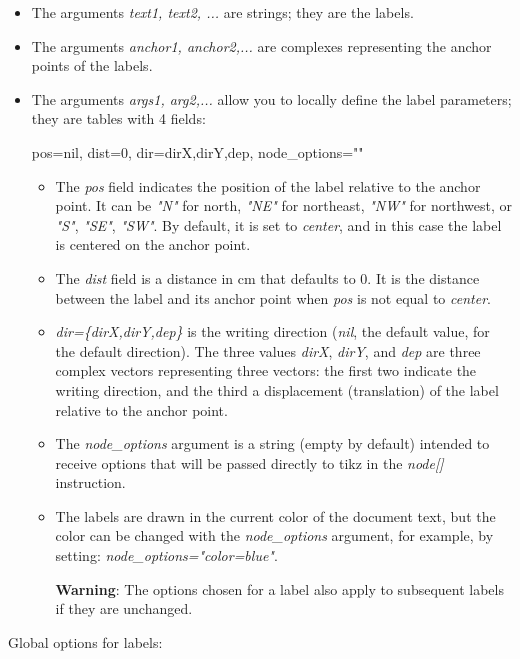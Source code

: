 \begin{itemize}
\begin{itemize}
    \item The arguments \emph{text1, text2, ...} are strings; they are the labels.     \item The arguments \emph{anchor1, anchor2,...} are complexes representing the anchor points of the labels.
    \item The arguments \emph{args1, arg2,...} allow you to locally define the label parameters; they are tables with 4 fields:
\begin{TeXcode}
{ pos=nil, dist=0, dir={dirX,dirY,dep}, node_options="" }
\end{TeXcode}
\begin{itemize}
    \item The \emph{pos} field indicates the position of the label relative to the anchor point. It can be \emph{"N"} for north, \emph{"NE"} for northeast, \emph{"NW"} for northwest, or \emph{"S"}, \emph{"SE"}, \emph{"SW"}. By default, it is set to \emph{center}, and in this case the label is centered on the anchor point.
    \item The \emph{dist} field is a distance in cm that defaults to $0$. It is the distance between the label and its anchor point when \emph{pos} is not equal to \emph{center}.
    \item \emph{dir=\{dirX,dirY,dep\}} is the writing direction (\emph{nil}, the default value, for the default direction). The three values ​​\emph{dirX}, \emph{dirY}, and \emph{dep} are three complex vectors representing three vectors: the first two indicate the writing direction, and the third a displacement (translation) of the label relative to the anchor point.     \item The \emph{node\_options} argument is a string (empty by default) intended to receive options that will be passed directly to tikz in the \emph{node{[}{]}} instruction.
    \item The labels are drawn in the current color of the document text, but the color can be changed with the \emph{node\_options} argument, for example, by setting: \emph{node\_options="color=blue"}.

\textbf{Warning}: The options chosen for a label also apply to subsequent labels if they are unchanged.
\end{itemize}
\end{itemize}

Global options for labels:


\end{itemize}
